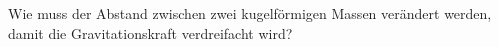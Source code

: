Wie muss der Abstand zwischen zwei kugelförmigen Massen verändert werden, damit die Gravitationskraft verdreifacht wird?
